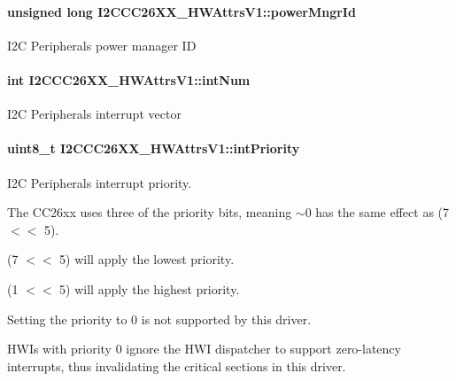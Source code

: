 \paragraph[{power\+Mngr\+Id}]{\setlength{\rightskip}{0pt plus 5cm}unsigned long I2\+C\+C\+C26\+X\+X\+\_\+\+H\+W\+Attrs\+V1\+::power\+Mngr\+Id}\label{struct_i2_c_c_c26_x_x___h_w_attrs_v1_ae4f13a6d9682c89ebaa095ac65550284}
I2\+C Peripheral\textquotesingle{}s power manager I\+D 
\paragraph[{int\+Num}]{\setlength{\rightskip}{0pt plus 5cm}int I2\+C\+C\+C26\+X\+X\+\_\+\+H\+W\+Attrs\+V1\+::int\+Num}\label{struct_i2_c_c_c26_x_x___h_w_attrs_v1_a47978d1b0177205345aea6760bdd44ff}
I2\+C Peripheral\textquotesingle{}s interrupt vector 
\paragraph[{int\+Priority}]{\setlength{\rightskip}{0pt plus 5cm}uint8\+\_\+t I2\+C\+C\+C26\+X\+X\+\_\+\+H\+W\+Attrs\+V1\+::int\+Priority}\label{struct_i2_c_c_c26_x_x___h_w_attrs_v1_af2ce41811fa52e3b70cb2388b1a9a5e4}


I2\+C Peripheral\textquotesingle{}s interrupt priority. 

The C\+C26xx uses three of the priority bits, meaning $\sim$0 has the same effect as (7 $<$$<$ 5).

(7 $<$$<$ 5) will apply the lowest priority.

(1 $<$$<$ 5) will apply the highest priority.

Setting the priority to 0 is not supported by this driver.

H\+W\+I\textquotesingle{}s with priority 0 ignore the H\+W\+I dispatcher to support zero-\/latency interrupts, thus invalidating the critical sections in this driver. 
